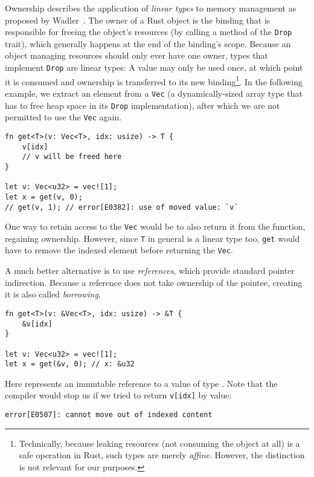 Ownership describes the application of \emph{linear types} to memory management
as proposed by Wadler~\cite{wadler1990linear}. The owner of a Rust object is the binding that is responsible for freeing the
object's resources (by calling a method of the \texttt{Drop} trait), which
generally happens at the end of the binding's scope.
Because an object managing resources should only ever have one owner, types that implement
\texttt{Drop} are linear types: A value may only be used once, at which point it is
consumed and ownership is transferred to its new binding\footnote{Technically,
  because leaking resources (\ie not consuming the object at all) is a safe operation in Rust, such types are merely
  \emph{affine}. However, the distinction is not relevant for our purposes.
}. In the following example, we extract an element from a \texttt{Vec} (a dynamically-sized array
type that has to free heap space in its \texttt{Drop} implementation), after which we are not permitted to use the \texttt{Vec} again.

\begin{verbatim}
fn get<T>(v: Vec<T>, idx: usize) -> T {
    v[idx]
    // v will be freed here
}

let v: Vec<u32> = vec![1];
let x = get(v, 0);
// get(v, 1); // error[E0382]: use of moved value: `v`
\end{verbatim}

One way to retain access to the \texttt{Vec} would be to also return it from the
function, regaining ownership. However, since \texttt{T} in general is a linear
type too, \texttt{get} would have to remove the indexed element before returning
the \texttt{Vec}.

A much better alternative is to use \emph{references}, which provide standard
pointer indirection. Because a reference does not take ownership of the pointee,
creating it is also called \emph{borrowing}.

\begin{verbatim}
fn get<T>(v: &Vec<T>, idx: usize) -> &T {
    &v[idx]
}

let v: Vec<u32> = vec![1];
let x = get(&v, 0); // x: &u32
\end{verbatim}

Here  represents an immutable reference to a value of type . Note that the compiler would stop us if we tried to return \texttt{v[idx]} by value:

\begin{verbatim}
error[E0507]: cannot move out of indexed content
\end{verbatim}

